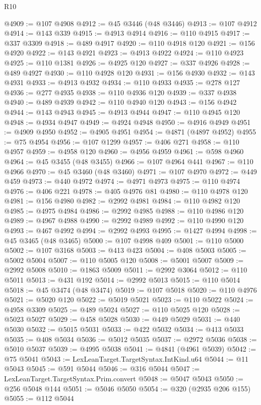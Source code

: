 \begin{lexlean}{R10}
\begin{coremodule}
@4909 := @107 @4908
@4912 := @45 @3446 (@48 @3446)
@4913 := @107 @4912
@4914 := @143 @339
@4915 := @4913 @4914
@4916 := @110 @4915
@4917 := @337 @3309
@4918 := @489 @4917
@4920 := @110 @4918 @120
@4921 := @156 @4920
@4922 := @143 @4921
@4923 := @4913 @4922
@4924 := @110 @4923
@4925 := @110 @1381
@4926 := @4925 @120
@4927 := @337 @4926
@4928 := @489 @4927
@4930 := @110 @4928 @120
@4931 := @156 @4930
@4932 := @143 @4931
@4933 := @4913 @4932
@4934 := @110 @4933
@4935 := @278 @127
@4936 := @277 @4935
@4938 := @110 @4936 @120
@4939 := @337 @4938
@4940 := @489 @4939
@4942 := @110 @4940 @120
@4943 := @156 @4942
@4944 := @143 @4943
@4945 := @4913 @4944
@4947 := @110 @4945 @120
@4948 := @4934 @4947
@4949 := @4924 @4948
@4950 := @4916 @4949
@4951 := @4909 @4950
@4952 := @4905 @4951
@4954 := @4871 (@4897 @4952)
@4955 := @75 @4954
@4956 := @107 @1299
@4957 := @406 @271
@4958 := @110 @4957
@4959 := @4958 @120
@4960 := @4956 @4959
@4961 := @598 @4960
@4964 := @45 @3455 (@48 @3455)
@4966 := @107 @4964 @441
@4967 := @110 @4966
@4970 := @45 @3460 (@48 @3460)
@4971 := @107 @4970
@4972 := @449 @459
@4973 := @440 @4972
@4974 := @4971 @4973
@4975 := @110 @4974
@4976 := @406 @221
@4978 := @405 @4976 @81
@4980 := @110 @4978 @120
@4981 := @156 @4980
@4982 := @2992 @4981
@4984 := @110 @4982 @120
@4985 := @4975 @4984
@4986 := @2992 @4985
@4988 := @110 @4986 @120
@4989 := @4967 @4988
@4990 := @2992 @4989
@4992 := @110 @4990 @120
@4993 := @467 @4992
@4994 := @2992 @4993
@4995 := @1427 @4994
@4998 := @45 @3465 (@48 @3465)
@5000 := @107 @4998 @409
@5001 := @110 @5000
@5002 := @107 @3168
@5003 := @413 @423
@5004 := @408 @5003
@5005 := @5002 @5004
@5007 := @110 @5005 @120
@5008 := @5001 @5007
@5009 := @2992 @5008
@5010 := @1863 @5009
@5011 := @2992 @3064
@5012 := @110 @5011
@5013 := @431 @192
@5014 := @2992 @5013
@5015 := @110 @5014
@5018 := @45 @3474 (@48 @3474)
@5019 := @107 @5018
@5020 := @110 @4976
@5021 := @5020 @120
@5022 := @5019 @5021
@5023 := @110 @5022
@5024 := @4958 @3309
@5025 := @489 @5024
@5027 := @110 @5025 @120
@5028 := @5023 @5027
@5029 := @458 @5028
@5030 := @449 @5029
@5031 := @440 @5030
@5032 := @5015 @5031
@5033 := @422 @5032
@5034 := @413 @5033
@5035 := @408 @5034
@5036 := @5012 @5035
@5037 := @2972 @5036
@5038 := @5010 @5037
@5039 := @4995 @5038
@5041 := @4841 (@4961 @5039)
@5042 := @75 @5041
@5043 := LexLeanTarget.TargetSyntax.IntKind.u64
@5044 := @11 @5043
@5045 := @591 @5044
@5046 := @316 @5044
@5047 := LexLeanTarget.TargetSyntax.Prim.convert
@5048 := @5047 @5043
@5050 := @256 @5048 @144
@5051 := @5046 @5050
@5054 := @320 (@2935 @206 @155)
@5055 := @112 @5044

\end{coremodule}
\end{lexlean}
